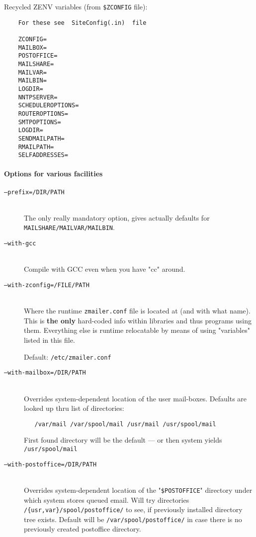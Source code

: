 Recycled ZENV variables (from {\tt \$ZCONFIG} file):
\begin{verbatim}
    For these see  SiteConfig(.in)  file

    ZCONFIG=
    MAILBOX=
    POSTOFFICE=
    MAILSHARE=
    MAILVAR=
    MAILBIN=
    LOGDIR=
    NNTPSERVER=
    SCHEDULEROPTIONS=
    ROUTEROPTIONS=
    SMTPOPTIONS=
    LOGDIR=
    SENDMAILPATH=
    RMAILPATH=
    SELFADDRESSES=
\end{verbatim}

\paragraph{Options for various facilities}

\begin{description}
\item[\tt ---prefix=/DIR/PATH] \mbox{} \\
The only really mandatory option, gives actually
defaults for \verb:MAILSHARE/MAILVAR/MAILBIN:.

\item[\tt ---with-gcc] \mbox{} \\
Compile with GCC even when you have "cc" around.

\item[\tt ---with-zconfig=/FILE/PATH] \mbox{} \\
Where the runtime   {\tt zmailer.conf}   file is located
at (and with what name).  This is {\bf the only} hard-coded
info within libraries and thus programs using them.
Everything else is runtime relocatable by means of using
"variables" listed in this file.

Default: {\tt /etc/zmailer.conf}

\item[\tt ---with-mailbox=/DIR/PATH] \mbox{} \\
Overrides system-dependent location of the user mail-boxes.
Defaults are looked up thru list of directories:
\begin{verbatim}
   /var/mail /var/spool/mail /usr/mail /usr/spool/mail
\end{verbatim}
First found directory will be the default --- or then
system yields  {\tt /usr/spool/mail}

\item[\tt ---with-postoffice=/DIR/PATH] \mbox{} \\
Overrides system-dependent location of the "{\tt \$POSTOFFICE}"
directory under which system stores queued email.
Will try directories \verb:/{usr,var}/spool/postoffice/: to
see, if previously installed directory tree exists.
Default will be  \verb:/var/spool/postoffice/:
in case there is no previously created postoffice directory.


\end{description}
